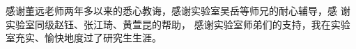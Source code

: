 
\begin{acknowledgement}
感谢董远老师两年多以来的悉心教诲，感谢实验室吴岳等师兄的耐心辅导，感 谢实验室同级赵钰、张江琦、黄萱昆的帮助，
感谢实验室师弟们的支持，我在实验室充实、愉快地度过了研究生生涯。
\end{acknowledgement}
